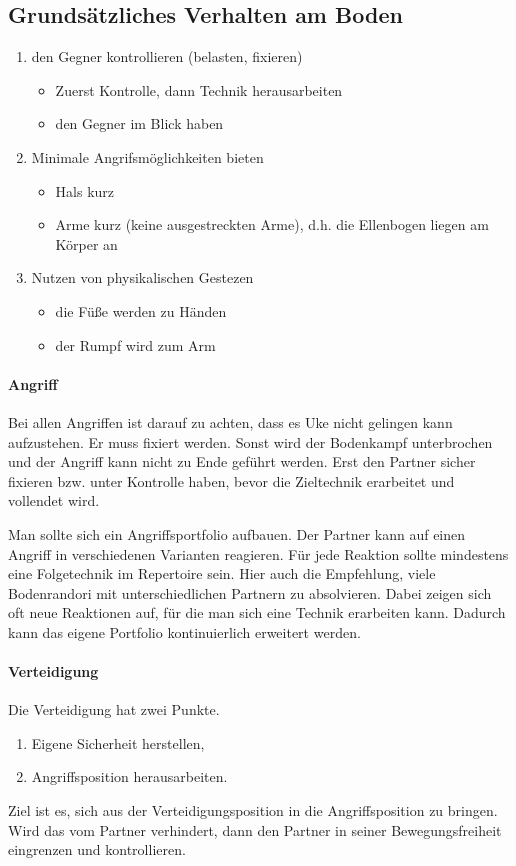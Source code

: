 \documentclass[justified, a4paper, notitlepage, captions=tableheading, nobib]{tufte-handout}
\begin{document}
\subsection{Grundsätzliches Verhalten am Boden}
\label{sec:org2b679cc}
\begin{enumerate}
\item den Gegner kontrollieren (belasten, fixieren) 
\begin{itemize}
\item Zuerst Kontrolle, dann Technik herausarbeiten
\item den Gegner im Blick haben
\end{itemize}
\item Minimale Angrifsmöglichkeiten bieten
\begin{itemize}
\item Hals kurz
\item Arme kurz (keine ausgestreckten Arme), d.h. die Ellenbogen liegen am Körper an
\end{itemize}
\item Nutzen von physikalischen Gestezen
\begin{itemize}
\item die Füße werden zu Händen
\item der Rumpf wird zum Arm
\end{itemize}
\end{enumerate}

\paragraph{Angriff}
\label{sec:orgc62c8af}
Bei allen Angriffen ist darauf zu achten, dass es Uke nicht gelingen kann aufzustehen. 
Er muss fixiert werden. Sonst wird der Bodenkampf unterbrochen und der Angriff kann nicht zu Ende geführt werden.
Erst den Partner sicher fixieren bzw. unter Kontrolle haben, bevor die Zieltechnik erarbeitet und vollendet wird.

Man sollte sich ein Angriffsportfolio aufbauen. Der Partner kann auf einen Angriff in verschiedenen Varianten reagieren. Für jede Reaktion sollte mindestens eine Folgetechnik im Repertoire sein. Hier auch die Empfehlung, viele Bodenrandori mit unterschiedlichen Partnern zu absolvieren. Dabei zeigen sich oft neue Reaktionen auf, für die man sich eine Technik erarbeiten kann. Dadurch kann das eigene Portfolio kontinuierlich erweitert werden. 

\paragraph{Verteidigung}
\label{sec:orgb6cd0a8}
Die Verteidigung hat zwei Punkte. 
\begin{enumerate}
\item Eigene Sicherheit herstellen,
\item Angriffsposition herausarbeiten.
\end{enumerate}
Ziel ist es, sich aus der Verteidigungsposition in die Angriffsposition zu bringen. 
Wird das vom Partner verhindert, dann den Partner in seiner Bewegungsfreiheit eingrenzen und kontrollieren.
\end{document}
